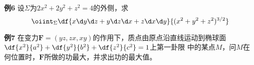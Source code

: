 \begin{frame}
	\linespread{1.2}
	\begin{exampleblock}{{\bf 例6}\hfill}
		设$\Sigma$为$2x^2+2y^2+z^2=4$的外侧，求
		$$\oiint_{\Sigma}\df{x\d y\d z+y\d z\d x+z\d x\d y}{(x^2+y^2+z^2)^{3/2}}$$
	\end{exampleblock}
\end{frame}

\begin{frame}
	\linespread{2}
	\begin{exampleblock}{{\bf 例7}\hfill}
		在变力$\bm{F}=(yz,zx,xy)$的作用下，质点由原点沿直线运动到椭球面
		$\df{x^2}{a^2}+\df{y^2}{b^2}+\df{z^2}{c^2}=1$上第一卦限
		中的某点$M$，问$M$在何位置时，$\bm{F}$所做的功最大，并求出功的最大值。
	\end{exampleblock}
\end{frame}


% 
